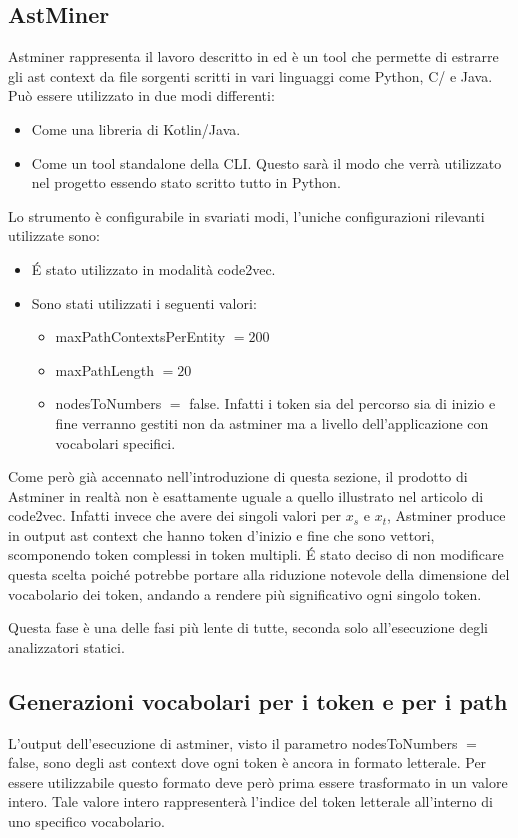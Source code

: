 \subsection{AstMiner}
Astminer rappresenta il lavoro descritto in \cite{kovalenko2019pathminer} ed è un tool che permette di estrarre gli ast context da file sorgenti scritti in vari linguaggi come Python, C/\CPP{} e Java.
Può essere utilizzato in due modi differenti:
  \begin{itemize}
    \item Come una libreria di Kotlin/Java.
    \item Come un tool standalone della CLI. Questo sarà il modo che verrà utilizzato nel progetto essendo stato scritto tutto in Python.
  \end{itemize}
Lo strumento è configurabile in svariati modi, l'uniche configurazioni rilevanti utilizzate sono:
  \begin{itemize}
    \item \'E stato utilizzato in modalità code2vec.
    \item Sono stati utilizzati i seguenti valori:
      \begin{itemize}
        \item maxPathContextsPerEntity $=200$
        \item maxPathLength $=20$
        \item nodesToNumbers $=$ false. Infatti i token sia del percorso sia di inizio e fine verranno gestiti non da astminer ma a livello dell'applicazione con vocabolari specifici.
      \end{itemize}
  \end{itemize}
Come però già accennato nell'introduzione di questa sezione, il prodotto di Astminer in realtà non è esattamente uguale a quello illustrato nel articolo di code2vec.
Infatti invece che avere dei singoli valori per $x_s$ e $x_t$, Astminer produce in output ast context che hanno token d'inizio e fine che sono vettori, scomponendo token complessi in token multipli.
\'E stato deciso di non modificare questa scelta poiché potrebbe portare alla riduzione notevole della dimensione del vocabolario dei token, andando a rendere più significativo ogni singolo token.

Questa fase è una delle fasi più lente di tutte, seconda solo all'esecuzione degli analizzatori statici.

\subsection{Generazioni vocabolari per i token e per i path}\label{subsec:vocab}
L'output dell'esecuzione di astminer, visto il parametro nodesToNumbers $=$ false, sono degli ast context dove ogni token è ancora in formato letterale.
Per essere utilizzabile questo formato deve però prima essere trasformato in un valore intero.
Tale valore intero rappresenterà l'indice del token letterale all'interno di uno specifico vocabolario.


